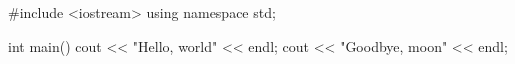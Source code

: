 #include <iostream>
using namespace std;

int main()
{
  cout << "Hello, world" << endl;
  cout << "Goodbye, moon" << endl;
}
